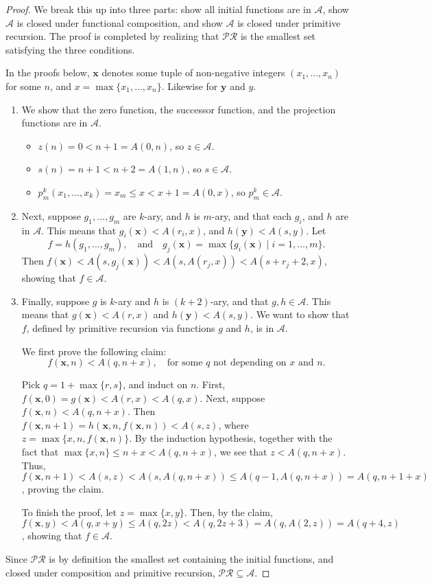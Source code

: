 \documentclass[12pt]{article}
\begin{document}
\begin{proof} We break this up into three parts: show all initial functions are in $\mathcal{A}$, show $\mathcal{A}$ is closed under functional composition, and show $\mathcal{A}$ is closed under primitive recursion.  The proof is completed by realizing that $\mathcal{PR}$ is the smallest set satisfying the three conditions.

In the proofs below, $\boldsymbol{x}$ denotes some tuple of non-negative integers $(x_1,\ldots,x_n)$ for some $n$, and $x = \max\lbrace x_1,\ldots,x_n\rbrace$.  Likewise for $\boldsymbol{y}$ and $y$.
\begin{enumerate}
\item We show that the zero function, the successor function, and the projection functions are in $\mathcal{A}$.
\begin{itemize}
\item $z(n)=0 < n+1=A(0,n)$, so $z\in \mathcal{A}$.
\item $s(n)=n+1 < n+2 = A(1,n)$, so $s\in \mathcal{A}$.
\item $p_m^k(x_1,\ldots, x_k)=x_m \le x < x+1 = A(0,x)$, so $p_m^k \in \mathcal{A}$.
\end{itemize}
\item Next, suppose $g_1, \ldots, g_m$ are $k$-ary, and $h$ is $m$-ary, and that each $g_i$, and $h$ are in $\mathcal{A}$.  This means that $g_i(\boldsymbol{x}) < A(r_i,x)$, and $h(\boldsymbol{y}) < A(s,y)$.  Let $$f=h(g_1,\ldots,g_m), \quad\mbox{and}\quad g_j(\boldsymbol{x}) = \max \lbrace g_i(\boldsymbol{x}) \mid i=1,\ldots, m \rbrace.$$  Then $f(\boldsymbol{x}) < A(s,g_j(\boldsymbol{x})) < A(s, A(r_j, x)) < A(s+ r_j+2,x)$, showing that $f\in \mathcal{A}$.
\item Finally, suppose $g$ is $k$-ary and $h$ is $(k+2)$-ary, and that $g,h\in \mathcal{A}$.  This means that $g(\boldsymbol{x})< A(r,x)$ and $h(\boldsymbol{y}) < A(s,y)$.   We want to show that $f$, defined by primitive recursion via functions $g$ and $h$, is in $\mathcal{A}$.

We first prove the following claim: $$f(\boldsymbol{x},n)<A(q,n+x), \quad \mbox{for some }q\mbox{ not depending on }x\mbox{ and }n.$$

Pick $q=1+\max \lbrace r,s\rbrace$, and induct on $n$.  First, $f(\boldsymbol{x},0) = g(\boldsymbol{x}) < A(r,x) <  A(q,x)$.  Next, suppose $f(\boldsymbol{x},n)< A(q,n+x)$.  Then $f(\boldsymbol{x},n+1) = h(\boldsymbol{x},n, f(\boldsymbol{x},n)) < A(s, z)$, where $z=\max \lbrace x,n, f(\boldsymbol{x},n)\rbrace$.  By the induction hypothesis, together with the fact that $\max\lbrace x,n\rbrace \le n+x < A(q,n+x)$, we see that $z<A(q,n+x)$.  Thus, $f(\boldsymbol{x},n+1) < A(s,z) < A(s,A(q,n+x)) \le A(q-1,A(q,n+x)) = A(q,n+1+x)$, proving the claim.

To finish the proof, let $z=\max\lbrace x,y\rbrace$.  Then, by the claim, $f(\boldsymbol{x},y) < A(q,x+y) \le A(q,2z) < A(q,2z+3) = A(q,A(2,z))=A(q+4,z)$, showing that $f\in \mathcal{A}$.
\end{enumerate}
Since $\mathcal{PR}$ is by definition the smallest set containing the initial functions, and closed under composition and primitive recursion, $\mathcal{PR}\subseteq \mathcal{A}$.
\end{proof}
\end{document}
